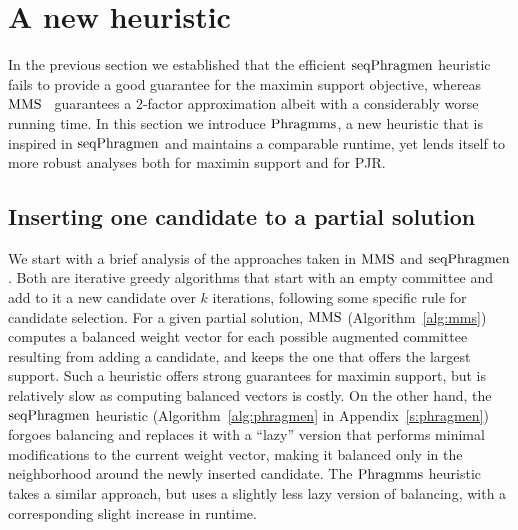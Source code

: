 \section{A new heuristic}\label{s:heuristic}

In the previous section we established that the efficient $\operatorname{seqPhragmen}$ heuristic~\cite{brill2017phragmen} fails to provide a good guarantee for the maximin support objective, whereas $\operatorname{MMS}$~\cite{sanchez2016maximin} guarantees a 2-factor approximation albeit with a considerably worse running time. 
In this section we introduce $\operatorname{Phragmms}$, a new heuristic that is inspired in $\operatorname{seqPhragmen}$ and maintains a comparable runtime, yet lends itself to more robust analyses both for maximin support and for PJR. 

\subsection{Inserting one candidate to a partial solution}\label{s:inserting}

We start with a brief analysis of the approaches taken in $\operatorname{MMS}$ and $\operatorname{seqPhragmen}$. Both are iterative greedy algorithms that start with an empty committee and add to it a new candidate over $k$ iterations, following some specific rule for candidate selection.
For a given partial solution, $\operatorname{MMS}$ (Algorithm~\ref{alg:mms}) computes a balanced weight vector for each possible augmented committee resulting from adding a candidate, and keeps the one that offers the largest support. 
Such a heuristic offers strong guarantees for maximin support, but is relatively slow as computing balanced vectors is costly. 
On the other hand, the $\operatorname{seqPhragmen}$ heuristic (Algorithm~\ref{alg:phragmen} in Appendix~\ref{s:phragmen}) forgoes balancing and replaces it with a ``lazy'' version that performs minimal modifications to the current weight vector, making it balanced only in the neighborhood around the newly inserted candidate. 
The $\operatorname{Phragmms}$ heuristic takes a similar approach, but uses a slightly less lazy version of balancing, with a corresponding slight increase in runtime. 

